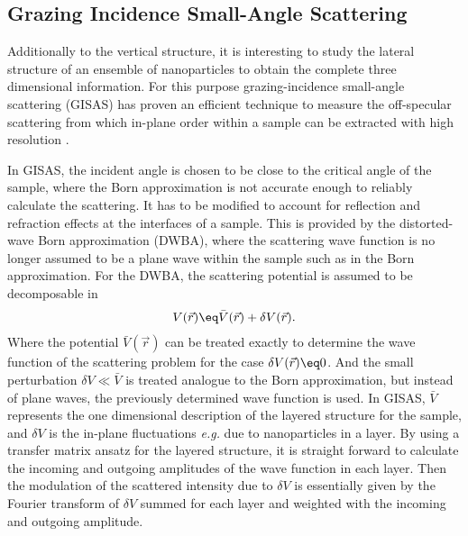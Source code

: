 \documentclass[\main/dresen_thesis.tex]{subfiles}
\begin{document}
  \subsection{Grazing Incidence Small-Angle Scattering}\label{sec:theoreticalBackground:scattering:GISAS}
    Additionally to the vertical structure, it is interesting to study the lateral structure of an ensemble of nanoparticles to obtain the complete three dimensional information.
    For this purpose grazing-incidence small-angle scattering (GISAS) has proven an efficient technique to measure the off-specular scattering from which in-plane order within a sample can be extracted with high resolution \cite{Renaud_2009_Probi}.

    In GISAS, the incident angle is chosen to be close to the critical angle of the sample, where the Born approximation is not accurate enough to reliably calculate the scattering.
    It has to be modified to account for reflection and refraction effects at the interfaces of a sample.
    This is provided by the distorted-wave Born approximation (DWBA), where the scattering wave function is no longer assumed to be a plane wave within the sample such as in the Born approximation.
    For the DWBA, the scattering potential is assumed to be decomposable in
    \begin{align}
      V(\vec{r}) \eq \bar{V}(\vec{r}) + \delta V(\vec{r}).
    \end{align}
    Where the potential $\bar{V}(\vec{r})$ can be treated exactly to determine the wave function of the scattering problem for the case $\delta V(\vec{r})\eq 0$.
    And the small perturbation $\delta V \ll \bar{V}$ is treated analogue to the Born approximation, but instead of plane waves, the previously determined wave function is used.
    In GISAS, $\bar{V}$ represents the one dimensional description of the layered structure for the sample, and $\delta V$ is the in-plane fluctuations \textit{e.g.} due to nanoparticles in a layer.
    By using a transfer matrix ansatz for the layered structure, it is straight forward to calculate the incoming and outgoing amplitudes of the wave function in each layer.
    Then the modulation of the scattered intensity due to $\delta V$ is essentially given by the Fourier transform of $\delta V$ summed for each layer and weighted with the incoming and outgoing amplitude.
\end{document}
